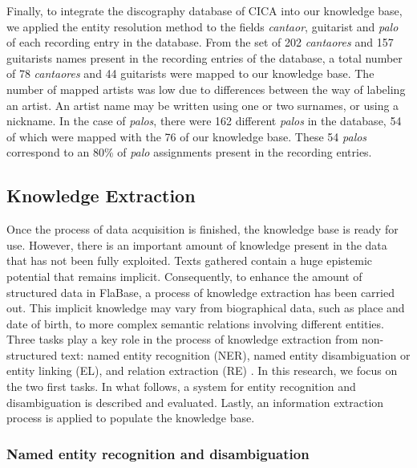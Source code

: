 Finally, to integrate the discography database of CICA into our knowledge base, we applied the entity resolution method to the fields \textit{cantaor}, guitarist and \textit{palo} of each recording entry in the database. From the set of 202 \textit{cantaores} and 157 guitarists names present in the recording entries of the database, a total number of 78 \textit{cantaores} and 44 guitarists were mapped to our knowledge base. The number of mapped artists was low due to differences between the way of labeling an artist. An artist name may be written using one or two surnames, or using a nickname. In the case of \textit{palos}, there were 162 different \textit{palos} in the database, 54 of which were mapped with the 76 of our knowledge base. These 54 \textit{palos} correspond to an 80\% of \textit{palo} assignments present in the recording entries.


\subsection{Knowledge Extraction}\label{sec:musicology:kb_extraction}

Once the process of data acquisition is finished, the knowledge base is ready for use. However, there is an important amount of knowledge present in the data that has not been fully exploited. Texts gathered contain a huge epistemic potential that remains implicit. Consequently, to enhance the amount of structured data in FlaBase, a process of knowledge extraction has been carried out. This implicit knowledge may vary from biographical data, such as place and date of birth, to more complex semantic relations involving different entities. Three tasks play a key role in the process of knowledge extraction from non-structured text: named entity recognition (NER), named entity disambiguation or entity linking (EL), and relation extraction (RE) \cite{Usbeck2014}. In this research, we focus on the two first tasks. In what follows, a system for entity recognition and disambiguation is described and evaluated. Lastly, an information extraction process is applied to populate the knowledge base.

\subsubsection{Named entity recognition and disambiguation}\label{sec:musicology:entity_linking}

